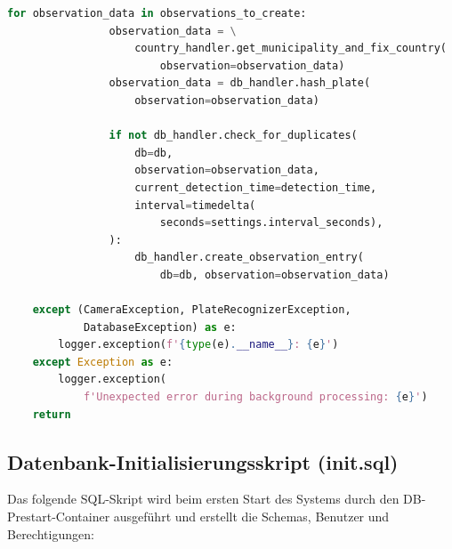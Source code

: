 \begin{lstlisting}[language=Python, caption={Vollständige Verarbeitungsmethode}, label={lst:process_full}]
            for observation_data in observations_to_create:
                observation_data = \
                    country_handler.get_municipality_and_fix_country(
                        observation=observation_data)
                observation_data = db_handler.hash_plate(
                    observation=observation_data)

                if not db_handler.check_for_duplicates(
                    db=db,
                    observation=observation_data,
                    current_detection_time=detection_time,
                    interval=timedelta(
                        seconds=settings.interval_seconds),
                ):
                    db_handler.create_observation_entry(
                        db=db, observation=observation_data)

    except (CameraException, PlateRecognizerException, 
            DatabaseException) as e:
        logger.exception(f'{type(e).__name__}: {e}')
    except Exception as e:
        logger.exception(
            f'Unexpected error during background processing: {e}')
    return
\end{lstlisting}

\newpage
\subsection{Datenbank-Initialisierungsskript (init.sql)}

Das folgende SQL-Skript wird beim ersten Start des Systems durch den DB-Prestart-Container ausgeführt und erstellt die Schemas, Benutzer und Berechtigungen:

